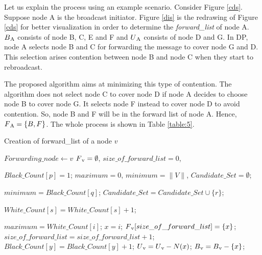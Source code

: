 Let us explain the process using an example scenario. Consider Figure \ref{cds}. Suppose node A is the broadcast initiator. Figure \ref{dis} is the redrawing of Figure \ref{cds} for better visualization in order to determine the \textit{forward\_list} of node A. $B\textsubscript{A}$ consists of node B, C, E and F and $U\textsubscript{A}$ consists of node D and G. In DP, node A selects node B and C for forwarding the message to cover node G and D. This selection arises contention between node B and node C when they start to rebroadcast.

The proposed algorithm aims at minimizing this type of contention. The algorithm does not select node C to cover node D if node A decides to choose node B to cover node G. It selects node F instead to cover node D to avoid contention. So, node B and F will be in the forward list of node A. Hence, $F\textsubscript{A}=\{B,F\}$. The whole process is shown in Table \ref{table:5}.
\begin{algorithm}
\caption{Creation of forward\_list of a node $v$}

\label{Algorithm2}
\begin{algorithmic}[1]
\STATE $Forwarding\_node \leftarrow v$
\STATE $F\textsubscript{v} = \emptyset$, $size\_of\_forward\_list=0$,

    \STATE $Black\_Count[p] = 1$;
 \ENDFOR
{}
    \STATE $maximum = 0$, $minimum=\|V\|$, $Candidate\_Set=\emptyset$;
    
            \STATE $minimum = Black\_Count[q] $;
        \ENDIF
    \ENDFOR
            \STATE $Candidate\_Set = Candidate\_Set \cup \{r\}$;
        \ENDIF
     \ENDFOR
     
                \STATE $ White\_Count[s] = White\_Count[s]+1 $;
            \ENDIF
        \ENDFOR
    \ENDFOR
    
            \STATE $maximum = White\_Count[i]$;
            \STATE $x = i$;
        \ENDIF
    \ENDFOR
     \STATE $F\textsubscript{v}[size\_of\_forward\_ list] = \{x\}$;
     \STATE $size\_of\_forward\_ list = size\_of\_forward\_ list + 1$;
        \STATE $ Black\_Count[y]= Black\_Count[y]+1$;
    \ENDFOR
     \STATE $ U\textsubscript{v} = U\textsubscript{v} - N(x)$;
      \STATE $B\textsubscript{v} = B\textsubscript{v}-\{x\}$;
     \ENDIF
\ENDWHILE
\end{algorithmic}
\end{algorithm}
